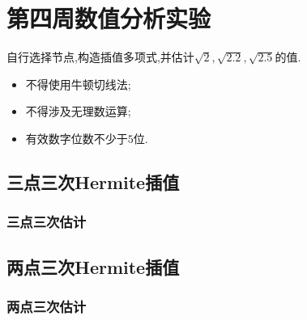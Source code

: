 \section{第四周数值分析实验}
\begin{ex}
	自行选择节点,构造插值多项式,并估计$\sqrt{2},\sqrt{2.2},\sqrt{2.5}$的值.
	\begin{itemize}
		\item 不得使用牛顿切线法;
		\item 不得涉及无理数运算;
		\item 有效数字位数不少于$5$位.
	\end{itemize}
\end{ex}
\subsection{三点三次Hermite插值}

\subsubsection{三点三次估计}

\subsection{两点三次Hermite插值}

\subsubsection{两点三次估计}


